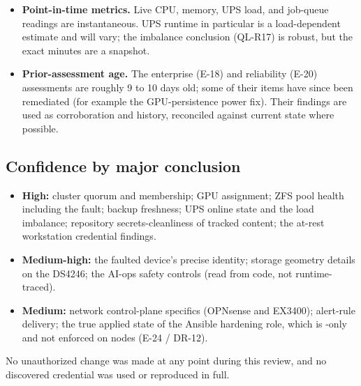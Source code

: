 \begin{itemize}
  warrant a human eyes-on for sensitivity (E-17).
  \item \textbf{Point-in-time metrics.} Live CPU, memory, UPS load, and job-queue
  readings are instantaneous. UPS runtime in particular is a load-dependent estimate
  and will vary; the imbalance conclusion (QL-R17) is robust, but the exact minutes
  are a snapshot.
  \item \textbf{Prior-assessment age.} The enterprise (E-18) and reliability (E-20)
  assessments are roughly 9 to 10 days old; some of their items have since been
  remediated (for example the GPU-persistence power fix). Their findings are used as
  corroboration and history, reconciled against current state where possible.
\end{itemize}

\subsection{Confidence by major conclusion}

\begin{itemize}
  \item \textbf{High:} cluster quorum and membership; GPU assignment; ZFS pool
  health including the  fault; backup freshness; UPS online state and the
  load imbalance; repository secrets-cleanliness of tracked content; the at-rest
  workstation credential findings.
  \item \textbf{Medium-high:} the faulted device's precise identity; storage
  geometry details on the DS4246; the AI-ops safety controls (read from code, not
  runtime-traced).
  \item \textbf{Medium:} network control-plane specifics (OPNsense and EX3400);
  alert-rule delivery; the true applied state of the Ansible hardening role, which
  is -only and not enforced on nodes (E-24 / DR-12).
\end{itemize}

No unauthorized change was made at any point during this review, and no discovered
credential was used or reproduced in full.
